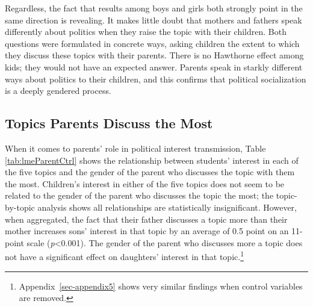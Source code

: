 \documentclass[
  letterpaper,
  DIV=11,
  numbers=noendperiod]{scrreprt}
\begin{document}
Regardless, the fact that results among boys and girls both strongly
point in the same direction is revealing. It makes little doubt that
mothers and fathers speak differently about politics when they raise the
topic with their children. Both questions were formulated in concrete
ways, asking children the extent to which they discuss these topics with
their parents. There is no Hawthorne effect among kids; they would not
have an expected answer. Parents speak in starkly different ways about
politics to their children, and this confirms that political
socialization is a deeply gendered process.

\hypertarget{topics-parents-discuss-the-most}{%
\subsection{Topics Parents Discuss the
Most}\label{topics-parents-discuss-the-most}}

When it comes to parents' role in political interest transmission, Table
\ref{tab:lmeParentCtrl} shows the relationship between students'
interest in each of the five topics and the gender of the parent who
discusses the topic with them the most. Children's interest in either of
the five topics does not seem to be related to the gender of the parent
who discusses the topic the most; the topic-by-topic analysis shows all
relationships are statistically insignificant. However, when aggregated,
the fact that their father discusses a topic more than their mother
increases sons' interest in that topic by an average of 0.5 point on an
11-point scale (\emph{p}\textless0.001). The gender of the parent who
discusses more a topic does not have a significant effect on daughters'
interest in that topic.\footnote{Appendix~\ref{sec-appendix5} shows very
  similar findings when control variables are removed.}
\end{document}
